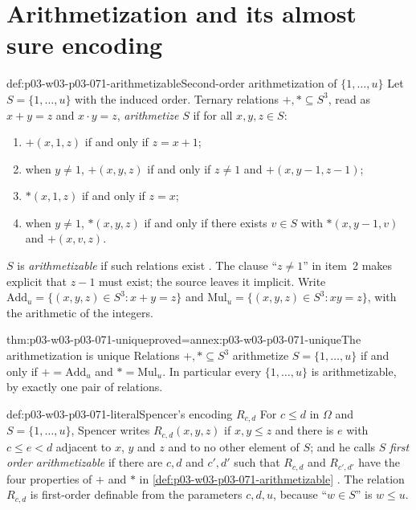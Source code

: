 \section{Arithmetization and its almost sure encoding}
\label{sec:p03-w03-p03-071-arithmetization}

\begin{hbdefinition}{def:p03-w03-p03-071-arithmetizable}{Second-order arithmetization of \(\{1,\ldots,u\}\)}
Let \(S=\{1,\ldots,u\}\) with the induced order.  Ternary relations
\(+,\ast\subseteq S^3\), read as \(x+y=z\) and \(x\cdot y=z\), \emph{arithmetize}
\(S\) if for all \(x,y,z\in S\):
\begin{enumerate}
\item \(+(x,1,z)\) if and only if \(z=x+1\);
\item when \(y\neq1\), \(+(x,y,z)\) if and only if \(z\neq1\) and
  \(+(x,y-1,z-1)\);
\item \(\ast(x,1,z)\) if and only if \(z=x\);
\item when \(y\neq1\), \(\ast(x,y,z)\) if and only if there exists \(v\in S\)
  with \(\ast(x,y-1,v)\) and \(+(x,v,z)\).
\end{enumerate}
\(S\) is \emph{arithmetizable} if such relations exist
\cite[p.~22]{Spencer2007LogicRandomStructuresAuthor}.  The clause
``\(z\neq1\)'' in item~2 makes explicit that \(z-1\) must exist; the source
leaves it implicit.  Write \(\mathrm{Add}_u=\{(x,y,z)\in S^3:x+y=z\}\) and
\(\mathrm{Mul}_u=\{(x,y,z)\in S^3:xy=z\}\), with the arithmetic of the
integers.
\end{hbdefinition}

\begin{hblemma}{thm:p03-w03-p03-071-unique}{proved=annex:p03-w03-p03-071-unique}{The arithmetization is unique}
Relations \(+,\ast\subseteq S^3\) arithmetize \(S=\{1,\ldots,u\}\) if and only
if \(+=\mathrm{Add}_u\) and \(\ast=\mathrm{Mul}_u\).  In particular every
\(\{1,\ldots,u\}\) is arithmetizable, by exactly one pair of relations.
\end{hblemma}

\begin{hbdefinition}{def:p03-w03-p03-071-literal}{Spencer's encoding \(R_{c,d}\)}
For \(c\leq d\) in \(\Omega\) and \(S=\{1,\ldots,u\}\), Spencer writes
\(R_{c,d}(x,y,z)\) if \(x,y\leq z\) and there is \(e\) with \(c\leq e<d\)
adjacent to \(x\), \(y\) and \(z\) and to no other element of \(S\); and he
calls \(S\) \emph{first order arithmetizable} if there are \(c,d\) and
\(c',d'\) such that \(R_{c,d}\) and \(R_{c',d'}\) have the four properties
of \(+\) and \(\ast\) in \cref{def:p03-w03-p03-071-arithmetizable}
\cite[pp.~22--23]{Spencer2007LogicRandomStructuresAuthor}.  The relation
\(R_{c,d}\) is first-order definable from the parameters \(c,d,u\), because
``\(w\in S\)'' is \(w\leq u\).
\end{hbdefinition}


